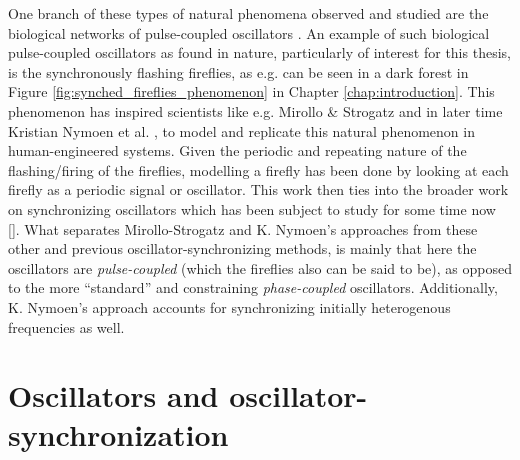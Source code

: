 One branch of these types of natural phenomena observed and studied are the biological networks of pulse-coupled oscillators \cite{proskurnikov_synchronization_2016, neda2000selfsorganizing}. An example of such biological pulse-coupled oscillators as found in nature, particularly of interest for this thesis, is the synchronously flashing fireflies, as e.g. can be seen in a dark forest in Figure \ref{fig:synched_fireflies_phenomenon} in Chapter \ref{chap:introduction}. This phenomenon has inspired scientists like e.g. Mirollo \& Strogatz \cite{mirollo_strogatz_PCO_synch} and in later time Kristian Nymoen et al. \cite{nymoen_synch}, to model and replicate this natural phenomenon in human-engineered systems. Given the periodic and repeating nature of the flashing/firing of the fireflies, modelling a firefly has been done by looking at each firefly as a periodic signal or oscillator. This work \cite{mirollo_strogatz_PCO_synch, nymoen_synch} then ties into the broader work on synchronizing oscillators which has been subject to study for some time now []. What separates Mirollo-Strogatz and K. Nymoen's approaches from these other and previous oscillator-synchronizing methods, is mainly that here the oscillators are \textit{pulse-coupled} (which the fireflies also can be said to be), as opposed to the more ``standard'' and constraining \textit{phase-coupled} oscillators. Additionally, K. Nymoen's approach accounts for synchronizing initially heterogenous frequencies as well.




\section{Oscillators and oscillator-synchronization}





